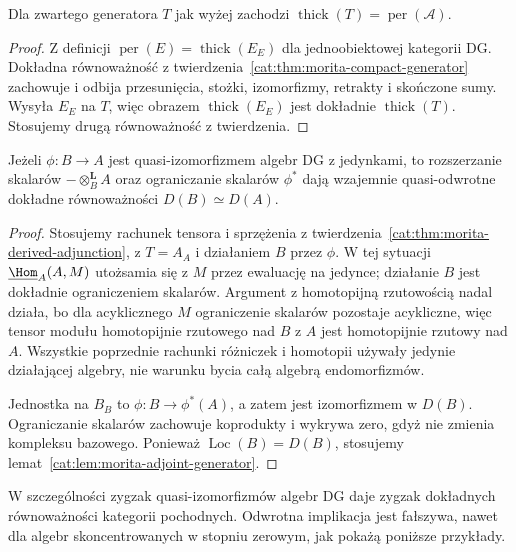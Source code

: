 \begin{wniosek}\label{cat:cor:morita-thick-generator}
Dla zwartego generatora $T$ jak wyżej zachodzi $\operatorname{thick}(T)=\operatorname{per}(\mathcal A)$.
\end{wniosek}
\begin{proof}
Z definicji $\operatorname{per}(E)=\operatorname{thick}(E_E)$ dla jednoobiektowej kategorii DG. Dokładna równoważność z twierdzenia~\ref{cat:thm:morita-compact-generator} zachowuje i odbija przesunięcia, stożki, izomorfizmy, retrakty i skończone sumy. Wysyła $E_E$ na $T$, więc obrazem $\operatorname{thick}(E_E)$ jest dokładnie $\operatorname{thick}(T)$. Stosujemy drugą równoważność z twierdzenia.
\end{proof}

\begin{stwierdzenie}\label{cat:prop:morita-dga-qiso}
Jeżeli $\phi:B\to A$ jest quasi-izomorfizmem algebr DG z jedynkami, to rozszerzanie skalarów $-\otimes_B^{\mathbf L}A$ oraz ograniczanie skalarów $\phi^*$ dają wzajemnie quasi-odwrotne dokładne równoważności $D(B)\simeq D(A)$.
\end{stwierdzenie}
\begin{proof}
Stosujemy rachunek tensora i sprzężenia z twierdzenia~\ref{cat:thm:morita-derived-adjunction}, z $T=A_A$ i działaniem $B$ przez $\phi$. W tej sytuacji $\underline{\Hom}_A(A,M)$ utożsamia się z $M$ przez ewaluację na jedynce; działanie $B$ jest dokładnie ograniczeniem skalarów. Argument z homotopijną rzutowością nadal działa, bo dla acyklicznego $M$ ograniczenie skalarów pozostaje acykliczne, więc tensor modułu homotopijnie rzutowego nad $B$ z $A$ jest homotopijnie rzutowy nad $A$. Wszystkie poprzednie rachunki różniczek i homotopii używały jedynie działającej algebry, nie warunku bycia całą algebrą endomorfizmów.

Jednostka na $B_B$ to $\phi:B\to \phi^*(A)$, a zatem jest izomorfizmem w $D(B)$. Ograniczanie skalarów zachowuje koprodukty i wykrywa zero, gdyż nie zmienia kompleksu bazowego. Ponieważ $\operatorname{Loc}(B)=D(B)$, stosujemy lemat~\ref{cat:lem:morita-adjoint-generator}.
\end{proof}

W szczególności zygzak quasi-izomorfizmów algebr DG daje zygzak dokładnych równoważności kategorii pochodnych. Odwrotna implikacja jest fałszywa, nawet dla algebr skoncentrowanych w stopniu zerowym, jak pokażą poniższe przykłady.

